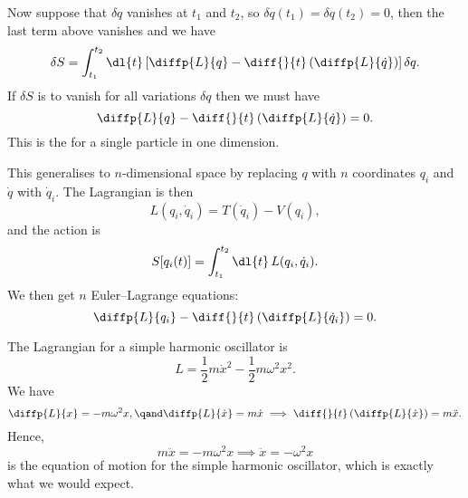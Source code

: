 \documentclass[fleqn]{NotesClass}
\newcommand{\lagrangian}{L}
\begin{document}
    Now suppose that \(\delta q\) vanishes at \(t_1\) and \(t_2\), so \(\delta q(t_1) = \delta q(t_2) = 0\), then the last term above vanishes and we have
    \begin{equation}
        \delta S = \int_{t_1}^{t_2} \dl{t} \left[ \diffp{\lagrangian}{q} - \diff{}{t}\left( \diffp{\lagrangian}{\dot{q}} \right) \right]\delta q.
    \end{equation}
    If \(\delta S\) is to vanish for all variations \(\delta q\) then we must have
    \begin{equation}
        \diffp{\lagrangian}{q} - \diff{}{t}\left( \diffp{\lagrangian}{\dot{q}} \right) = 0.
    \end{equation}
    This is the  for a single particle in one dimension.
    
    This generalises to \(n\)-dimensional space by replacing \(q\) with \(n\) coordinates \(q_i\) and \(\dot{q}\) with \(\dot{q}_i\).
    The Lagrangian is then
    \begin{equation}
        \lagrangian(q_i, \dot{q}_i) = T(\dot{q}_i) - V(q_i),
    \end{equation}
    and the action is
    \begin{equation}
        S[q_i(t)] = \int_{t_1}^{t_2} \dl{t} \, \lagrangian(q_i, \dot{q}_i).
    \end{equation}
    We then get \(n\) Euler--Lagrange equations:
    \begin{equation}
        \diffp{\lagrangian}{q_i} - \diff{}{t} \left( \diffp{\lagrangian}{\dot{q}_i} \right) = 0.
    \end{equation}
    
    \begin{exm}{}{}
        The Lagrangian for a simple harmonic oscillator is
        \begin{equation}
            \lagrangian = \frac{1}{2} m \dot{x}^2 - \frac{1}{2} m\omega^2 x^2.
        \end{equation}
        We have
        \begin{equation}
            \diffp{\lagrangian}{x} = -m\omega^2 x, \qand \diffp{\lagrangian}{\dot{x}} = m\dot{x} \implies \diff{}{t}\left( \diffp{\lagrangian}{\dot{x}} \right) = m\ddot{x}.
        \end{equation}
        Hence,
        \begin{equation}
            m\ddot{x} = -m\omega^2 x \implies \ddot{x} = -\omega^2 x
        \end{equation}
        is the equation of motion for the simple harmonic oscillator, which is exactly what we would expect.
    \end{exm}
    
\end{document}
